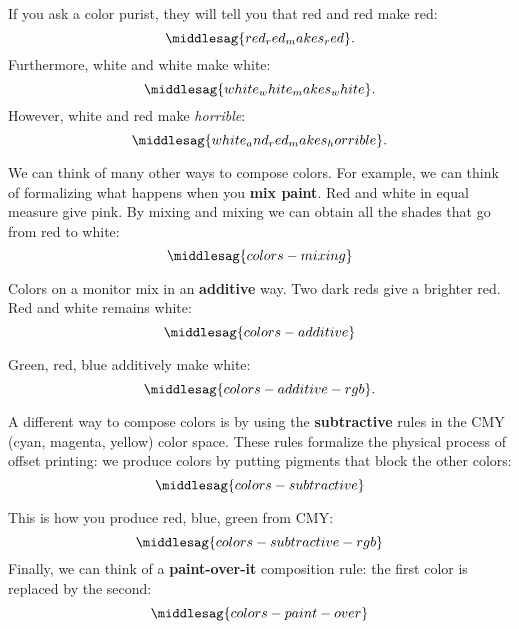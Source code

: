 If you ask a color purist, they will tell you that red and red make red:
%
\begin{equation*}
    \middlesag{red_red_makes_red}.
\end{equation*}
%
Furthermore, white and white make white:
%
\begin{equation*}
    \middlesag{white_white_makes_white}.
\end{equation*}
%
However, white and red make \emph{horrible}:
%
\begin{equation*}
    \middlesag{white_and_red_makes_horrible}.
\end{equation*}


We can think of many other ways to compose colors.
For example, we can think of formalizing what happens when you \textbf{mix paint}.
Red and white in equal measure give pink.
By mixing and mixing we can obtain all the shades that go from red to white:
\begin{equation}
    \label{eq:colors-mixing}
    \middlesag{colors-mixing}
\end{equation}

Colors on a monitor mix in an \textbf{additive} way.
Two dark reds give a brighter red.
Red and white remains white:
%
\begin{equation}
    \label{eq:colors-additive}
    \middlesag{colors-additive} %
\end{equation}

Green, red, blue additively make white:
\begin{equation}
    \label{eq:colors-additive-rgb}
    \middlesag{colors-additive-rgb}.
\end{equation}

A different way to compose colors is by using the \textbf{subtractive} rules in the CMY (cyan, magenta, yellow) color space.
These rules formalize the physical process of offset printing: we produce colors by putting pigments that block the other colors:
\begin{equation}
    \label{eq:colors_subtractive}
    \middlesag{colors-subtractive}
\end{equation}

This is how you produce red, blue, green from CMY:
%
\begin{equation}
    \label{eq:colors-subtractive-rgb}
    \middlesag{colors-subtractive-rgb}
\end{equation}
%
Finally, we can think of a \textbf{paint-over-it} composition rule: the first color is replaced by the second:
%
\begin{equation}
    \label{eq:colors-paint-over}
    \middlesag{colors-paint-over}
\end{equation}

